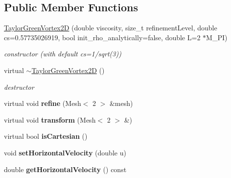 \subsection*{Public Member Functions}
\begin{DoxyCompactItemize}
\item 
\hyperlink{classnatrium_1_1TaylorGreenVortex2D_a7f03f55df315b2b2ac1671fa3d07e9df}{TaylorGreenVortex2D} (double viscosity, size\_\-t refinementLevel, double cs=0.57735026919, bool init\_\-rho\_\-analytically=false, double L=2 $\ast$M\_\-PI)
\begin{DoxyCompactList}\small\item\em constructor (with default cs=1/sqrt(3)) \item\end{DoxyCompactList}\item 
\hypertarget{classnatrium_1_1TaylorGreenVortex2D_abb6099f4f9791f7decabb35ccd3dbe49}{
virtual \hyperlink{classnatrium_1_1TaylorGreenVortex2D_abb6099f4f9791f7decabb35ccd3dbe49}{$\sim$TaylorGreenVortex2D} ()}
\label{classnatrium_1_1TaylorGreenVortex2D_abb6099f4f9791f7decabb35ccd3dbe49}

\begin{DoxyCompactList}\small\item\em destructor \item\end{DoxyCompactList}\item 
\hypertarget{classnatrium_1_1TaylorGreenVortex2D_af6f95264a645d97ea207b3e083b8994f}{
virtual void {\bfseries refine} (Mesh$<$ 2 $>$ \&mesh)}
\label{classnatrium_1_1TaylorGreenVortex2D_af6f95264a645d97ea207b3e083b8994f}

\item 
\hypertarget{classnatrium_1_1TaylorGreenVortex2D_a0319526156d349175c2cc7c499a81abe}{
virtual void {\bfseries transform} (Mesh$<$ 2 $>$ \&)}
\label{classnatrium_1_1TaylorGreenVortex2D_a0319526156d349175c2cc7c499a81abe}

\item 
\hypertarget{classnatrium_1_1TaylorGreenVortex2D_a8e58992bc24488b0bc4ea2df4971cd5a}{
virtual bool {\bfseries isCartesian} ()}
\label{classnatrium_1_1TaylorGreenVortex2D_a8e58992bc24488b0bc4ea2df4971cd5a}

\item 
\hypertarget{classnatrium_1_1TaylorGreenVortex2D_ad58ed418e97c541c3d9f8a1b7153bc08}{
void {\bfseries setHorizontalVelocity} (double u)}
\label{classnatrium_1_1TaylorGreenVortex2D_ad58ed418e97c541c3d9f8a1b7153bc08}

\item 
\hypertarget{classnatrium_1_1TaylorGreenVortex2D_a3f47e0968be3cd7ef9ec1cafef8124ab}{
double {\bfseries getHorizontalVelocity} () const }
\label{classnatrium_1_1TaylorGreenVortex2D_a3f47e0968be3cd7ef9ec1cafef8124ab}

\end{DoxyCompactItemize}


